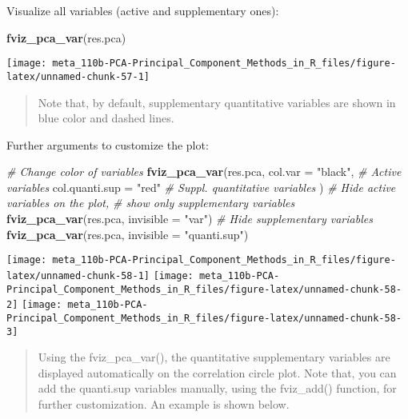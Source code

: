 \documentclass[]{book}
\newenvironment{Shaded}{\begin{snugshade}}{\end{snugshade}}
\newcommand{\CommentTok}[1]{\textcolor[rgb]{0.56,0.35,0.01}{\textit{#1}}}
\newcommand{\DataTypeTok}[1]{\textcolor[rgb]{0.13,0.29,0.53}{#1}}
\newcommand{\KeywordTok}[1]{\textcolor[rgb]{0.13,0.29,0.53}{\textbf{#1}}}
\newcommand{\NormalTok}[1]{#1}
\newcommand{\StringTok}[1]{\textcolor[rgb]{0.31,0.60,0.02}{#1}}
\begin{document}
Visualize all variables (active and supplementary ones):

\begin{Shaded}
\begin{Highlighting}[]
\KeywordTok{fviz_pca_var}\NormalTok{(res.pca)}
\end{Highlighting}
\end{Shaded}

\begin{center}\texttt{[image: meta\_110b-PCA-Principal\_Component\_Methods\_in\_R\_files/figure-latex/unnamed-chunk-57-1]} \end{center}

\begin{quote}
Note that, by default, supplementary quantitative variables are shown in blue color and dashed lines.
\end{quote}

Further arguments to customize the plot:

\begin{Shaded}
\begin{Highlighting}[]
\CommentTok{# Change color of variables}
\KeywordTok{fviz_pca_var}\NormalTok{(res.pca,}
             \DataTypeTok{col.var =} \StringTok{"black"}\NormalTok{,     }\CommentTok{# Active variables}
             \DataTypeTok{col.quanti.sup =} \StringTok{"red"} \CommentTok{# Suppl. quantitative variables}
\NormalTok{             )}
\CommentTok{# Hide active variables on the plot, }
\CommentTok{# show only supplementary variables}
\KeywordTok{fviz_pca_var}\NormalTok{(res.pca, }\DataTypeTok{invisible =} \StringTok{"var"}\NormalTok{)}
\CommentTok{# Hide supplementary variables}
\KeywordTok{fviz_pca_var}\NormalTok{(res.pca, }\DataTypeTok{invisible =} \StringTok{"quanti.sup"}\NormalTok{)}
\end{Highlighting}
\end{Shaded}

\begin{center}\texttt{[image: meta\_110b-PCA-Principal\_Component\_Methods\_in\_R\_files/figure-latex/unnamed-chunk-58-1]} \texttt{[image: meta\_110b-PCA-Principal\_Component\_Methods\_in\_R\_files/figure-latex/unnamed-chunk-58-2]} \texttt{[image: meta\_110b-PCA-Principal\_Component\_Methods\_in\_R\_files/figure-latex/unnamed-chunk-58-3]} \end{center}

\begin{quote}
Using the fviz\_pca\_var(), the quantitative supplementary variables are displayed automatically on the correlation circle plot. Note that, you can add the quanti.sup variables manually, using the fviz\_add() function, for further customization. An example is shown below.
\end{quote}
\end{document}
